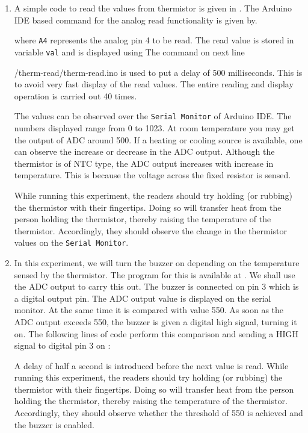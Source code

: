 \begin{enumerate}
  \item A simple code to read the values from thermistor is given in
        . The Arduino IDE based command for the analog read functionality is given by.
        
        where {\tt A4} represents the analog pin 4 to be read.
        The read value is stored in variable {\tt val} and is
        displayed using 
        The command on next line

          {\LocTHERMardcode/therm-read/therm-read.ino}
        is used to put a delay of 500 milliseconds. This is to avoid very fast display of the read values. The entire reading and display operation is carried out 40 times.

        The values can be observed over the {\tt Serial Monitor} of Arduino IDE.
        The numbers displayed range from 0 to 1023. At room temperature you may get the
        output of ADC around 500. If a heating or cooling source is available,
        one can observe the increase or decrease in the ADC output. Although
        the thermistor is of NTC type, the ADC output increases with increase
        in temperature. This is because the voltage across the fixed resistor
        is sensed.

        While running this experiment,
        the readers should try holding (or rubbing) the thermistor with their fingertips.
        Doing so will transfer heat from the person holding the
        thermistor, thereby raising the temperature of the thermistor. Accordingly, they should observe the change in the thermistor values
        on the {\tt Serial Monitor}.

  \item In this experiment, we will turn the buzzer on depending
        on the temperature sensed by the thermistor. The program for this is
        available at . We shall use the ADC output
        to carry this out. The buzzer is connected on pin 3 which is a
        digital output pin. The ADC output value is displayed on the serial
        monitor. At the same time it is compared with value 550. As
        soon as the ADC output exceeds 550, the buzzer is given a digital
        high signal, turning it on. The following lines of code perform this
        comparison and sending a {HIGH} signal to digital pin 3 on \arduino:
        
        A delay of half a second is introduced
        before the next value is read. While running this experiment,
        the readers should try holding (or rubbing) the thermistor with their fingertips.
        Doing so will transfer heat from the person holding the
        thermistor, thereby raising the temperature of the thermistor.
        Accordingly, they should observe whether the threshold of 550 is achieved
        and the buzzer is enabled.


\end{enumerate}
